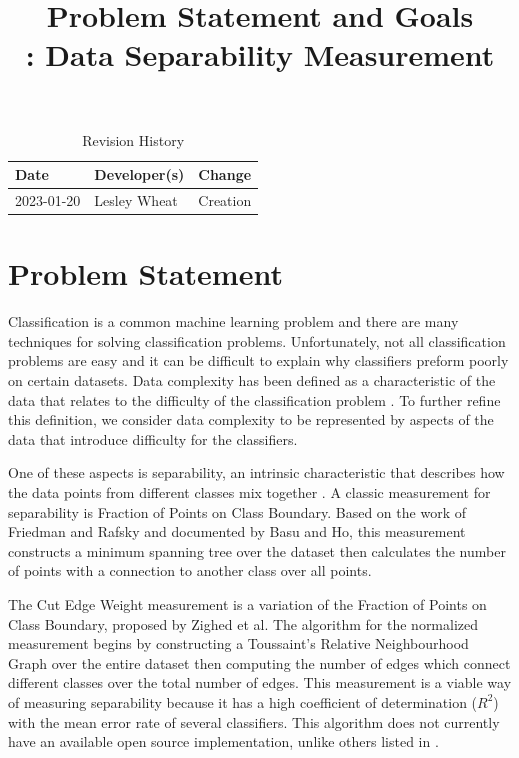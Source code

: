 \documentclass{article}
\title{Problem Statement and Goals\\\progname: Data Separability Measurement}
\author{\authname}
\date{}
\begin{document}
\maketitle

\begin{table}[hp]
\caption{Revision History} \label{TblRevisionHistory}
\begin{tabularx}{\textwidth}{llX}
\toprule
\textbf{Date} & \textbf{Developer(s)} & \textbf{Change}\\
\midrule
2023-01-20 & Lesley Wheat & Creation\\
\bottomrule
\end{tabularx}
\end{table}

\section{Problem Statement}

Classification is a common machine learning problem and there are many techniques for solving classification problems. 
Unfortunately, not all classification problems are easy and it can be difficult to explain why classifiers preform poorly on certain datasets. 
Data complexity has been defined as a characteristic of the data that relates to the difficulty of the classification problem \cite{luengo_automatic_2015}. 
To further refine this definition, we consider data complexity to be represented by aspects of the data that introduce difficulty for the classifiers. 

One of these aspects is separability, an intrinsic characteristic that describes how the data points from different classes mix together \cite{guan_novel_2021}. 
A classic measurement for separability is Fraction of Points on Class Boundary.
Based on the work of Friedman and Rafsky \cite{friedman_multivariate_1979} and documented by Basu and Ho\cite{ho_complexity_2002}, this measurement constructs a minimum spanning tree over the dataset then calculates the number of points with a connection to another class over all points.

The Cut Edge Weight measurement \cite{zighed_statistical_2005} is a variation of the Fraction of Points on Class Boundary, proposed by Zighed et al. 
The algorithm for the normalized measurement begins by constructing a Toussaint’s Relative Neighbourhood Graph \cite{toussaint_relative_1980} over the entire dataset then computing the number of edges which connect different classes over the total number of edges. 
This measurement is a viable way of measuring separability because it has a high coefficient of determination ($R^2$) with the mean error rate of several classifiers.
This algorithm does not currently have an available open source implementation, unlike others listed in \cite{ho_complexity_2002}.
\end{document}
